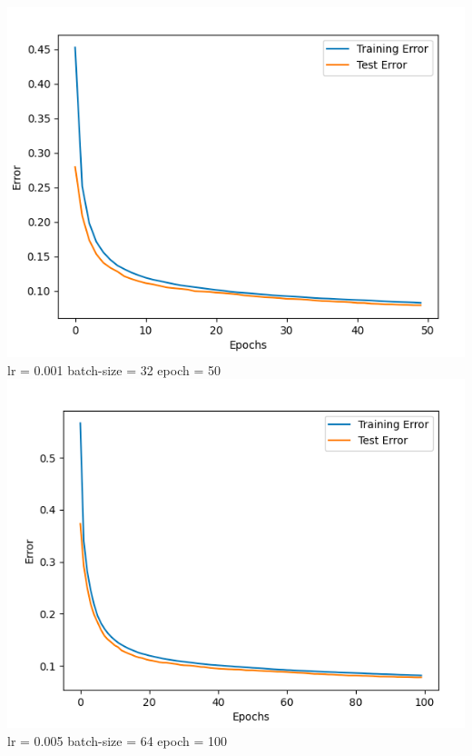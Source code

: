 \documentclass[a4paper]{article}
\theoremstyle{definition}
\newenvironment{soln}{
    \leavevmode\color{blue}\ignorespaces
}{}
\begin{document}
\begin{enumerate}
\begin{soln}
\begin{center}
 \includegraphics[scale=0.4]{d1=300e1=50}\\
  lr = 0.001 batch-size = 32 epoch = 50 \\
 \includegraphics[scale=0.4]{d1=300e1=100}\\
  lr = 0.005 batch-size = 64 epoch = 100 \\
 

\end{center}
\end{soln}
\end{enumerate}
\end{document}
